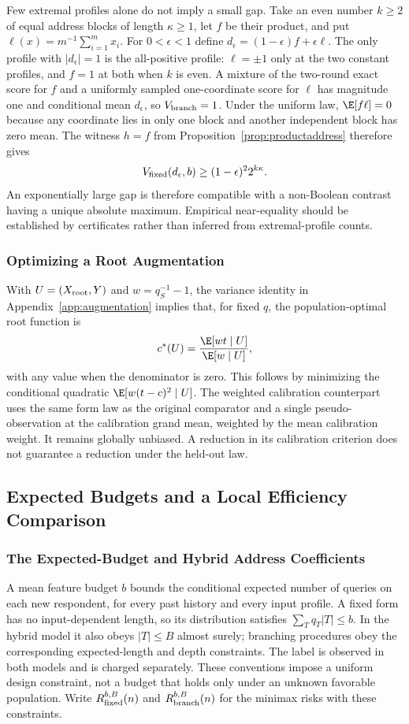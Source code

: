 Few extremal profiles alone do not imply a small gap. Take an even number $k\ge2$ of equal address blocks of length $\kappa\ge1$, let $f$ be their product, and put $\ell(x)=m^{-1}\sum_{i=1}^m x_i$. For $0<\epsilon<1$ define $d_\epsilon=(1-\epsilon)f+\epsilon\ell$. The only profile with $|d_\epsilon|=1$ is the all-positive profile: $\ell=\pm1$ only at the two constant profiles, and $f=1$ at both when $k$ is even. A mixture of the two-round exact score for $f$ and a uniformly sampled one-coordinate score for $\ell$ has magnitude one and conditional mean $d_\epsilon$, so $V_{\rm branch}=1$. Under the uniform law, $\E[f\ell]=0$ because any coordinate lies in only one block and another independent block has zero mean. The witness $h=f$ from Proposition~\ref{prop:productaddress} therefore gives
\[
 V_{\rm fixed}(d_\epsilon,b)\ge(1-\epsilon)^2 2^{k\kappa}.
\]
An exponentially large gap is therefore compatible with a non-Boolean contrast having a unique absolute maximum. Empirical near-equality should be established by certificates rather than inferred from extremal-profile counts.

\subsubsection{Optimizing a Root Augmentation}\label{app:weightedroot}
With $U=(X_{\rm root},Y)$ and $w=q_S^{-1}-1$, the variance identity in Appendix~\ref{app:augmentation} implies that, for fixed $q$, the population-optimal root function is
\[
 c^*(U)=\frac{\E[wt\mid U]}{\E[w\mid U]},
\]
with any value when the denominator is zero. This follows by minimizing the conditional quadratic $\E[w(t-c)^2\mid U]$. The weighted calibration counterpart uses the same form law as the original comparator and a single pseudo-observation at the calibration grand mean, weighted by the mean calibration weight. It remains globally unbiased. A reduction in its calibration criterion does not guarantee a reduction under the held-out law.

\subsection{Expected Budgets and a Local Efficiency Comparison}\label{app:costlocal}
\subsubsection{The Expected-Budget and Hybrid Address Coefficients}\label{app:expectedproof}
A mean feature budget $b$ bounds the conditional expected number of queries on
each new respondent, for every past history and every input profile. A fixed
form has no input-dependent length, so its distribution satisfies
$\sum_Tq_T|T|\le b$. In the hybrid model it also obeys $|T|\le B$ almost surely;
branching procedures obey the corresponding expected-length and depth
constraints. The label is observed in both models and is charged separately.
These conventions impose a uniform design constraint, not a budget that holds
only under an unknown favorable population. Write $R^{b,B}_{\rm fixed}(n)$ and
$R^{b,B}_{\rm branch}(n)$ for the minimax risks with these constraints.

